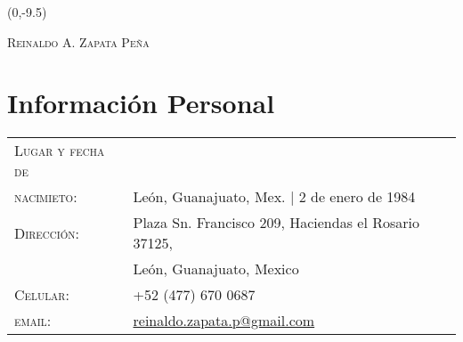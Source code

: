 \documentclass[letterpaper,10pt]{article}
\begin{document}
\begin{textblock}{1}(0,-9.5)
\end{textblock}

\begin{center}
{\Huge \textsc{Reinaldo A. Zapata Pe\~na}}\\[5pt]
{\Large\color{headings}}
\end{center}

\section{Informaci\'on Personal}
\begin{tabular}{R{4cm}l}
\textsc{Lugar y fecha de }	&	\\
\textsc{nacimieto:}			&	Le\'on, Guanajuato, Mex. |  2 de enero de 1984 \\
\textsc{Direcci\'on:}		&	Plaza Sn. Francisco 209, Haciendas el Rosario 37125, \\
							& 	Le\'on, Guanajuato, Mexico \\
\textsc{Celular:}			&	+52 (477) 670 0687\\
\textsc{email:}				&	\href{mailto:reinaldo.zapata.p@gmail.com}{reinaldo.zapata.p@gmail.com}
\end{tabular}
\end{document}
